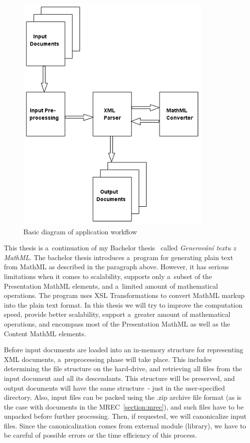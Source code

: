 \documentclass[11pt,oneside,final]{fithesis2}
\begin{document}
\begin{figure}[!ht]
\centering
\includegraphics{basic_diagram}
\caption{Basic diagram of application workflow}
\label{fig:basicworkflow}
\end{figure}

This thesis is a~continuation of my Bachelor thesis~\cite{Kucbel2011thesis} called \textit{Generování textu z MathML}. The bachelor thesis introduces a~program for generating plain text from MathML as described in the paragraph above. However, it has serious limitations when it comes to scalability, supports only a~subset of the Presentation MathML elements, and a~limited amount of mathematical operations. The program uses XSL Transformations to convert MathML markup into the plain text format. In this thesis we will try to improve the computation speed, provide better scalability, support a~greater amount of mathematical operations, and encompass most of the Presentation MathML as well as the Content MathML elements.

Before input documents are loaded into an in-memory structure for representing XML documents, a~preprocessing phase will take place. This includes determining the file structure on the hard-drive, and retrieving all files from the input document and all its descendants. This structure will be preserved, and output documents will have the same structure~- just in the user-specified directory. Also, input files can be packed using the .zip archive file format (as is the case with documents in the MREC~\ref{section:mrec}), and such files have to be unpacked before further processing. Then, if requested, we will canonicalize input files. Since the canonicalization comes from external module (library), we have to be careful of possible errors or the time efficiency of this process. 
\end{document}
